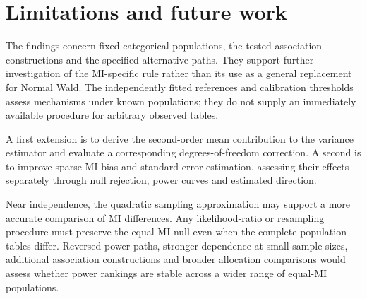 \section{Limitations and future work}

The findings concern fixed categorical populations, the tested association
constructions and the specified alternative paths. They support further
investigation of the MI-specific rule rather than its use as a general
replacement for Normal Wald. The independently fitted references and
calibration thresholds assess mechanisms under known populations; they
do not supply an immediately available procedure for arbitrary observed
tables.

A first extension is to derive the second-order mean contribution to the
variance estimator and evaluate a corresponding degrees-of-freedom
correction. A second is to improve sparse MI bias and standard-error
estimation, assessing their effects separately through null rejection,
power curves and estimated direction.

Near independence, the quadratic sampling approximation may support a
more accurate comparison of MI differences. Any likelihood-ratio or
resampling procedure must preserve the equal-MI null even when the
complete population tables differ. Reversed power paths, stronger
dependence at small sample sizes, additional association constructions
and broader allocation comparisons would
assess whether power rankings are stable across a wider range of
equal-MI populations.
